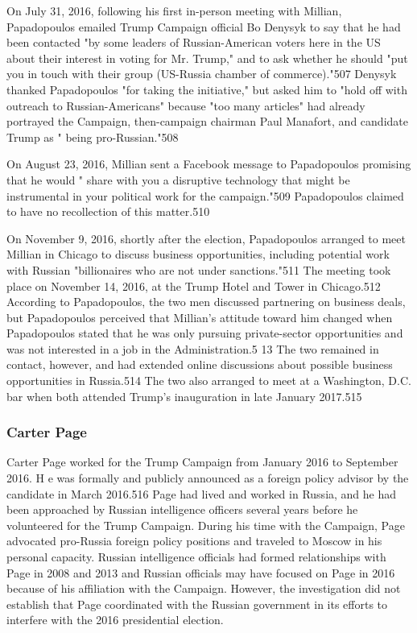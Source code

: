On July 31,  2016, following his first in-person meeting with Millian,  Papadopoulos emailed Trump Campaign official Bo Denysyk to say that he had been contacted "by some leaders of Russian-American voters here in the US about their interest in voting for Mr. Trump," and to ask whether he should "put you in touch with their group (US-Russia chamber of commerce)."507 Denysyk thanked Papadopoulos "for taking the initiative," but asked him to "hold off with outreach to Russian-Americans" because "too many articles" had already portrayed the Campaign, then-campaign chairman Paul Manafort, and candidate Trump as " being pro-Russian."508

On August 23, 2016, Millian sent a Facebook message to Papadopoulos promising that he would " share with you a disruptive technology that might be instrumental in your political work for the campaign."509 Papadopoulos claimed to have no recollection of this matter.510

On November 9, 2016, shortly after the election, Papadopoulos arranged to meet Millian in Chicago to discuss business opportunities, including potential work with Russian "billionaires who are not under sanctions."511 The meeting took place on November 14, 2016,  at the Trump Hotel and Tower in Chicago.512 According to Papadopoulos, the two men discussed partnering on business deals, but Papadopoulos perceived that Millian's attitude toward him changed when Papadopoulos stated that he was only pursuing private-sector opportunities and was not interested in a job in the Administration.5 13 The two remained in contact, however, and had extended online discussions about possible business opportunities in Russia.514 The two also arranged to meet at a Washington, D.C. bar when both attended Trump's inauguration in late January 2017.515

\subsubsection{Carter Page}

Carter Page worked for the Trump Campaign from January 2016 to September 2016. H e was formally and publicly announced as a  foreign policy advisor by the candidate in March 2016.516 Page had lived and worked in Russia, and he had been approached by Russian intelligence officers several years before he volunteered for the Trump Campaign. During his time with the Campaign, Page advocated pro-Russia foreign policy positions and traveled to Moscow in his personal capacity. Russian intelligence officials had formed relationships with Page in 2008 and 2013 and Russian officials may have focused on Page in 2016 because of his affiliation with the Campaign. However, the investigation did not establish that Page coordinated with the Russian government in its efforts to interfere with the 2016 presidential election.

